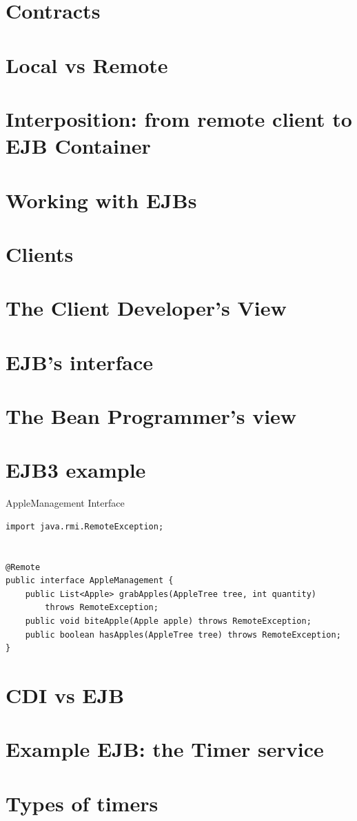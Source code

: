\section{Contracts}

\section{Local vs Remote}

\section{Interposition:	from remote client to EJB Container}

\section{Working with EJBs}

\section{Clients}

\section{The Client Developer’s View}

\section{EJB’s interface}


\section{The Bean Programmer’s view}


\section{EJB3 example}

AppleManagement Interface

\begin{verbatim}
import java.rmi.RemoteException;


@Remote
public interface AppleManagement {
	public List<Apple> grabApples(AppleTree tree, int quantity)
		throws RemoteException;
	public void biteApple(Apple apple) throws RemoteException;
	public boolean hasApples(AppleTree tree) throws RemoteException;
}
\end{verbatim}


\section{CDI vs EJB}



\section{Example EJB: the Timer service}



\section{Types of timers}






